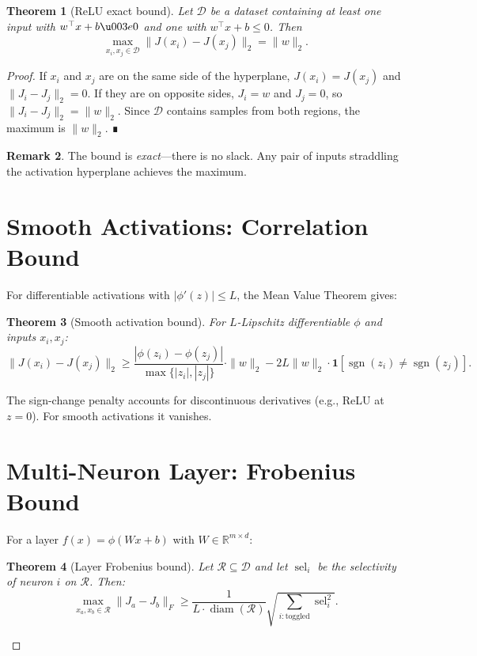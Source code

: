 \documentclass[11pt,a4paper]{amsart}
\theoremstyle{plain}
\newtheorem{theorem}{Theorem}[section]
\theoremstyle{definition}
\newtheorem{remark}[theorem]{Remark}
\begin{document}
\begin{theorem}[ReLU exact bound]\label{thm:relu}
Let $\mathcal{D}$ be a dataset containing at least one input with
$w^\top x+b\u003e0$ and one with $w^\top x+b\leq 0$. Then
\[
\max_{x_i,x_j\in\mathcal{D}} \|J(x_i)-J(x_j)\|_2 = \|w\|_2.
\]
\end{theorem}

\begin{proof}
If $x_i$ and $x_j$ are on the same side of the hyperplane, $J(x_i)=J(x_j)$
and $\|J_i-J_j\|_2=0$. If they are on opposite sides, $J_i=w$ and
$J_j=0$, so $\|J_i-J_j\|_2=\|w\|_2$. Since $\mathcal{D}$ contains
samples from both regions, the maximum is $\|w\|_2$. ∎

\begin{remark}
The bound is \emph{exact}---there is no slack. Any pair of inputs
straddling the activation hyperplane achieves the maximum.
\end{remark}

\section{Smooth Activations: Correlation Bound}

For differentiable activations with $|\phi'(z)|\leq L$, the Mean
Value Theorem gives:

\begin{theorem}[Smooth activation bound]\label{thm:smooth}
For $L$-Lipschitz differentiable $\phi$ and inputs $x_i,x_j$:
\[
\|J(x_i)-J(x_j)\|_2 \geq
\frac{|\phi(z_i)-\phi(z_j)|}{\max\{|z_i|,|z_j|\}} \cdot \|w\|_2
- 2L\|w\|_2 \cdot \mathbf{1}[\operatorname{sgn}(z_i)\neq\operatorname{sgn}(z_j)].
\]
\end{theorem}

The sign-change penalty accounts for discontinuous derivatives
(e.g., ReLU at $z=0$). For smooth activations it vanishes.

\section{Multi-Neuron Layer: Frobenius Bound}

For a layer $f(x)=\phi(Wx+b)$ with $W\in\mathbb{R}^{m\times d}$:

\begin{theorem}[Layer Frobenius bound]\label{thm:layer}
Let $\mathcal{R}\subseteq\mathcal{D}$ and let $\operatorname{sel}_i$ be
the selectivity of neuron $i$ on $\mathcal{R}$. Then:
\[
\max_{x_a,x_b\in\mathcal{R}} \|J_a-J_b\|_F \geq
\frac{1}{L\cdot\operatorname{diam}(\mathcal{R})}
\sqrt{\sum_{i:\text{toggled}} \operatorname{sel}_i^2}.
\]
\end{theorem}


\end{proof}
\end{document}
